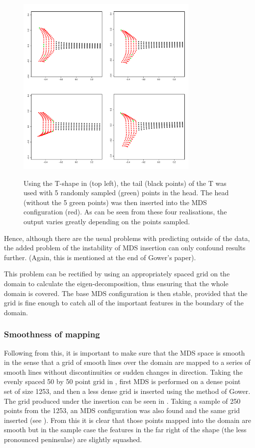 \begin{figure}
\centering
\includegraphics[width=3.5in]{mds/figs/tshaperand.pdf} \\
\caption{Using the T-shape in  (top left), the tail (black points) of the T was used with 5 randomly sampled (green) points in the head. The head (without the 5 green points) was then inserted into the MDS configuration (red). As can be seen from these four realisations, the output varies greatly depending on the points sampled.}
\label{tshaperand}
\end{figure}

Hence, although there are the usual problems with predicting outside of the data, the added problem of the instability of MDS insertion can only confound results further. (Again, this is mentioned at the end of Gower's paper).

This problem can be rectified by using an appropriately spaced grid on the domain to calculate the eigen-decomposition, thus ensuring that the whole domain is covered. The base MDS configuration is then stable, provided that the grid is fine enough to catch all of the important features in the boundary of the domain.

\subsubsection{Smoothness of mapping}
\label{mds-smoothness}

Following from this, it is important to make sure that the MDS space is smooth in the sense that a grid of smooth lines over the domain are mapped to a series of smooth lines without discontinuities or sudden changes in direction. Taking the evenly spaced 50 by 50 point grid in , first MDS is performed on a dense point set of size 1253, and then a less dense grid is inserted using the method of Gower. The grid produced under the insertion can be seen in . Taking a sample of 250 points from the 1253, an MDS configuration was also found and the same grid inserted (see ). From this it is clear that those points mapped into the domain are smooth but in the sample case the features in the far right of the shape (the less pronounced peninsulae) are slightly squashed.

